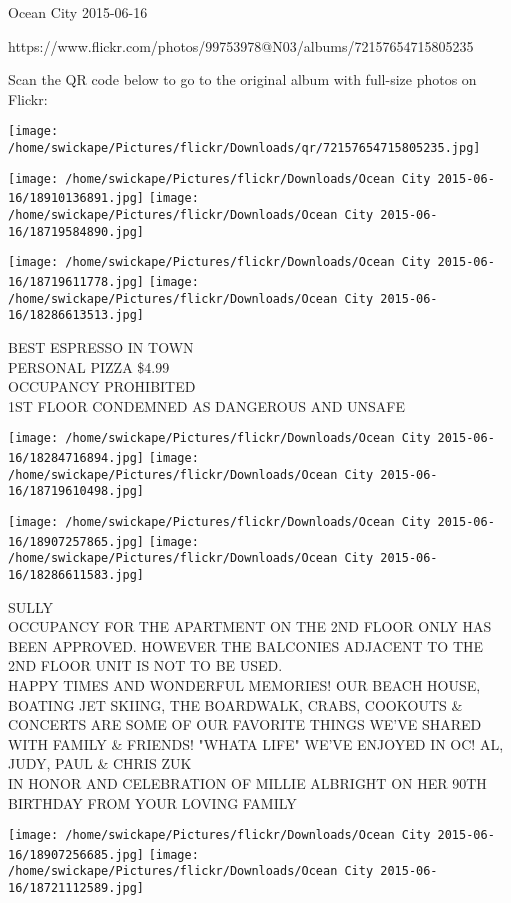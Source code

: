 \documentclass[10pt,letterpaper]{article}
\begin{document}
Ocean City 2015-06-16

https://www.flickr.com/photos/99753978@N03/albums/72157654715805235

Scan the QR code below to go to the original album with full-size photos on Flickr:

\texttt{[image: /home/swickape/Pictures/flickr/Downloads/qr/72157654715805235.jpg]}
\pagebreak

\texttt{[image: /home/swickape/Pictures/flickr/Downloads/Ocean City 2015-06-16/18910136891.jpg]}
\texttt{[image: /home/swickape/Pictures/flickr/Downloads/Ocean City 2015-06-16/18719584890.jpg]}

\texttt{[image: /home/swickape/Pictures/flickr/Downloads/Ocean City 2015-06-16/18719611778.jpg]}
\texttt{[image: /home/swickape/Pictures/flickr/Downloads/Ocean City 2015-06-16/18286613513.jpg]}

BEST ESPRESSO IN TOWN\\
PERSONAL PIZZA \$4.99\\
OCCUPANCY PROHIBITED\\
1ST FLOOR CONDEMNED AS DANGEROUS AND UNSAFE\\
\pagebreak

\texttt{[image: /home/swickape/Pictures/flickr/Downloads/Ocean City 2015-06-16/18284716894.jpg]}
\texttt{[image: /home/swickape/Pictures/flickr/Downloads/Ocean City 2015-06-16/18719610498.jpg]}

\texttt{[image: /home/swickape/Pictures/flickr/Downloads/Ocean City 2015-06-16/18907257865.jpg]}
\texttt{[image: /home/swickape/Pictures/flickr/Downloads/Ocean City 2015-06-16/18286611583.jpg]}

SULLY\\
OCCUPANCY FOR THE APARTMENT ON THE 2ND FLOOR ONLY HAS BEEN APPROVED.  HOWEVER THE BALCONIES ADJACENT TO THE 2ND FLOOR UNIT IS NOT TO BE USED.\\
HAPPY TIMES AND WONDERFUL MEMORIES!  OUR BEACH HOUSE, BOATING JET SKIING, THE BOARDWALK, CRABS, COOKOUTS \& CONCERTS ARE SOME OF OUR FAVORITE THINGS WE'VE SHARED WITH FAMILY \& FRIENDS!  "WHATA LIFE" WE'VE ENJOYED IN OC!  AL, JUDY, PAUL \& CHRIS ZUK\\
IN HONOR AND CELEBRATION OF MILLIE ALBRIGHT ON HER 90TH BIRTHDAY FROM YOUR LOVING FAMILY\\
\pagebreak

\texttt{[image: /home/swickape/Pictures/flickr/Downloads/Ocean City 2015-06-16/18907256685.jpg]}
\texttt{[image: /home/swickape/Pictures/flickr/Downloads/Ocean City 2015-06-16/18721112589.jpg]}
\end{document}
